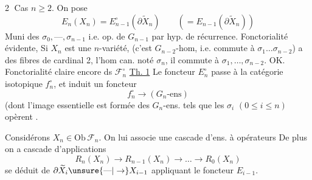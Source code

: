 \textcircled{2} Cas $n\geq2$. On pose
\[ E_n(X_n)=E_{n-1}^\circ(\partial\widetilde X_n)\qquad(=E_{n-1}(\partial\widetilde X_n)) \]
Muni des $\sigma_0,\text{---},\sigma_{n-1}$ i.e. op. de $G_{n-1}$ par hyp. de récurrence. Fonctorialité évidente, 
Si $X_n$ est une $n$-variété,  
(c'est  $G_{n-2}$-hom, i.e. commute à $\sigma_1\ldots\sigma_{n-2}$) a des fibres de cardinal 2, l'hom can.  noté $\sigma_n$, il commute à $\sigma_1,\ldots,\sigma_{n-2}$. OK.
Fonctorialité claire encore ds $\mathcal F_n^\circ$
\uline{Th. 1}  Le foncteur $E_n^\circ$ passe à la catégorie isotopique $f_n^\circ$, et induit un foncteur 
\[ f_n^\circ\longrightarrow(G_n\text{-ens}) \]
(dont l'image essentielle est formée des $G_n$-ens. tels que les $\sigma_i$ $(0\leq i\leq n)$  opèrent  .

Considérons $X_n\in\mathrm{Ob}\,\mathcal F_n$. On lui associe une cascade d'ens. à opérateurs
De plus on a    cascade d'applications
\[ R_n(X_n)\to R_{n-1}(X_n)\to\ldots\to R_0(X_n) \]
se déduit de $\partial\widetilde X_i\unsure{\text{---}|\to}X_{i-1}$  appliquant le foncteur $E_{i-1}$.

